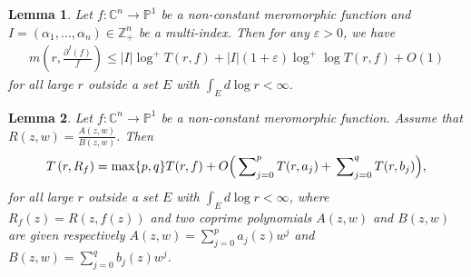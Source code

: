 \documentclass[11pt,reqno]{amsart}
\newtheorem{lem}{Lemma}[section]
\numberwithin{equation}{section}
\begin{document}
\begin{lem}\label{L2} \cite[Lemma 1.37]{Hu-Li-Yang-2003} Let $f:\mathbb{C}^n\to\mathbb{P}^1$ be a non-constant meromorphic function and $I=(\alpha_1,\ldots,\alpha_n)\in \mathbb{Z}^n_+$ be a multi-index. Then for any $\varepsilon>0$, we have
\begin{align*}
m\left(r,\frac{\partial^I(f)}{f}\right)\leq |I|\log^+T(r,f)+|I|(1+\varepsilon)\log^+\log T(r,f)+O(1)
\end{align*}
for all large $r$ outside a set $E$ with $\int_E d\log r<\infty$.
\end{lem}

\begin{lem}\label{L3} \cite[Theorem 1.26]{Hu-Li-Yang-2003} Let $f:\mathbb{C}^n\to\mathbb{P}^1$ be a non-constant meromorphic function. Assume that 
$R(z, w)=\frac{A(z, w)}{B(z, w)}$. Then
\begin{align*}
 T\left(r, R_f\right)=\max \{p, q\} T(r, f)+O\Big(\sideset{}{_{j=0}^{p}}{\sum}T(r, a_j)+\sideset{}{_{j=0}^{q}}{\sum}T(r, b_j)\Big),
 \end{align*}
for all large $r$ outside a set $E$ with $\int_E d\log r<\infty$, where $R_f(z)=R(z, f(z))$ and two coprime polynomials $A(z, w)$ and $B(z,w)$ are given
respectively $A(z,w)=\sum_{j=0}^p a_j(z)w^j$ and $B(z,w)=\sum_{j=0}^q b_j(z)w^j$.
\end{lem}
\end{document}
